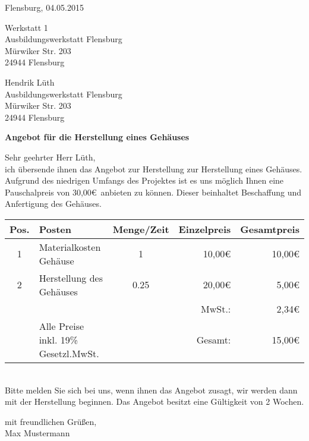 \pagebreak
Flensburg, 04.05.2015
\begin{flushright}
Werkstatt 1\\
Ausbildungswerkstatt Flensburg\\
Mürwiker Str. 203\\
24944 Flensburg
\end{flushright}
\bigskip
\bigskip
\bigskip
Hendrik Lüth\\
Ausbildungswerkstatt Flensburg\\
Mürwiker Str. 203\\
24944 Flensburg\\
\begin{flushleft}
\bigskip

\textbf{Angebot für die Herstellung eines Gehäuses}
\bigskip
\bigskip

Sehr geehrter Herr Lüth,\\
\bigskip
ich übersende ihnen das Angebot zur Herstellung zur Herstellung eines Gehäuses.\\
Aufgrund des niedrigen Umfangs des Projektes ist es uns möglich Ihnen eine Pauschalpreis von 30,00\euro\ anbieten zu können. Dieser beinhaltet Beschaffung und Anfertigung des Gehäuses.\\
\bigskip
\begin{tabular}{cp{7cm}cr|r|}
\hline
\multicolumn{1}{|l|}{Pos.} & \multicolumn{1}{l|}{Posten} & \multicolumn{1}{l|}{Menge/Zeit} & Einzelpreis & Gesamtpreis \\ \hline
\multicolumn{1}{|c|}{1} & \multicolumn{1}{l|}{Materialkosten Gehäuse} & \multicolumn{1}{c|}{1} & 10,00\euro & 10,00\euro \\ \hline
\multicolumn{1}{|c|}{2} & \multicolumn{1}{l|}{Herstellung des Gehäuses} & \multicolumn{1}{c|}{0.25} & 20,00\euro & 5,00\euro \\ \hline
 & & & MwSt.: & 2,34\euro \\ \cline{5-5}
                       & Alle Preise inkl. 19\% Gesetzl.MwSt. &                       & Gesamt: & 15,00\euro \\ \cline{5-5} 
\end{tabular}\\
\bigskip
Bitte melden Sie sich bei uns, wenn ihnen das Angebot zusagt, wir werden dann mit der Herstellung beginnen. Das Angebot besitzt eine Gültigkeit von 2 Wochen.
\bigskip

mit freundlichen Grüßen,\\
\bigskip
Max Mustermann
\end{flushleft}
